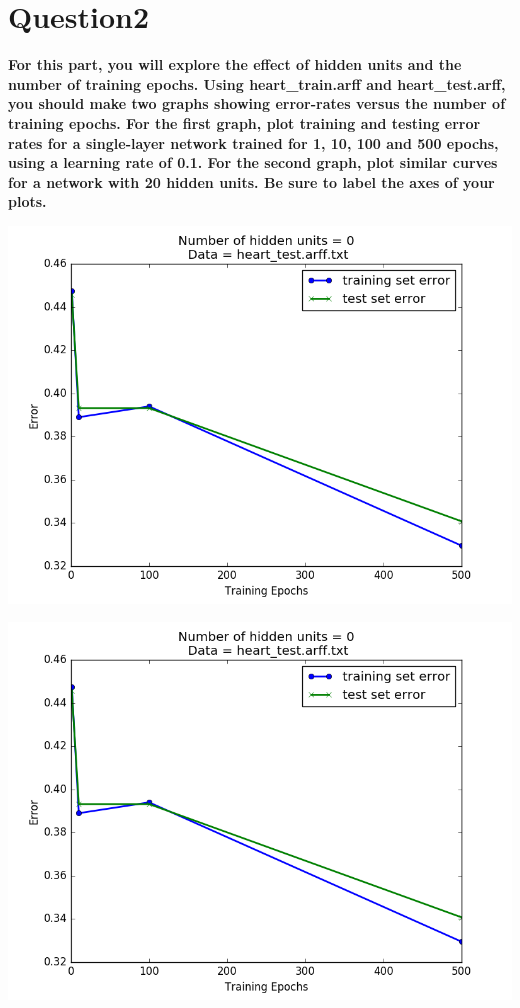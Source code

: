 \documentclass[paper=a4, fontsize=11pt]{scrartcl} %
\numberwithin{equation}{section} %
\numberwithin{figure}{section} %
\numberwithin{table}{section} %
\begin{document}
\section*{Question2}
\textbf{For this part, you will explore the effect of hidden units and the number of training epochs. Using heart\_train.arff and heart\_test.arff, you should make two graphs showing error-rates versus the number of training epochs. For the first graph, plot training and testing error rates for a single-layer network trained for 1, 10, 100 and 500 epochs, using a learning rate of 0.1. For the second graph, plot similar curves for a network with 20 hidden units. Be sure to label the axes of your plots.}
\begin{center}
\includegraphics[scale=.5]{pics/learningCurve_1.png}
\end{center}
\begin{center}
\includegraphics[scale=.5]{pics/learningCurve_1.png}
\end{center}
\end{document}
